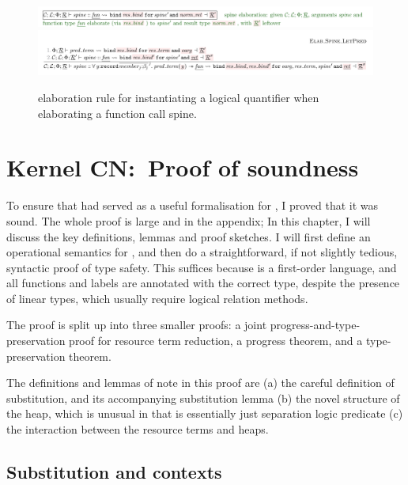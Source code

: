 \begin{figure}[tp]
    \includegraphics{figures/kernel-elab-spine-1}
    \includegraphics{figures/kernel-elab-spine-2}
    \caption{ elaboration rule for instantiating a logical
        quantifier when elaborating a function call spine.}\label{fig:elab-spine}
\end{figure}

\chapter{Kernel CN:\ Proof of soundness}%
\label{chap:kernel-soundness}

To ensure that  had served as a useful formalisation for ,
I proved that it was sound. The whole proof is large and in the appendix; In
this chapter, I will discuss the key definitions, lemmas and proof sketches. I
will first define an operational semantics for , and then do a
straightforward, if not slightly tedious, syntactic proof of type
safety. This suffices because  is a
first-order language, and all functions and labels are annotated with the
correct type,  despite the presence of linear types, which usually require
logical relation methods.

The proof is split up into three smaller proofs: a joint
progress-and-type-preservation proof for resource term reduction, a progress
theorem, and a type-preservation theorem.

The definitions and lemmas of note in this proof are (a) the careful definition
of substitution, and its accompanying substitution lemma (b) the novel
structure of the heap, which is unusual in that is essentially just separation
logic predicate (c) the interaction between the resource terms and heaps.

\section{Substitution and contexts}\label{sec:sub-ctxts}

